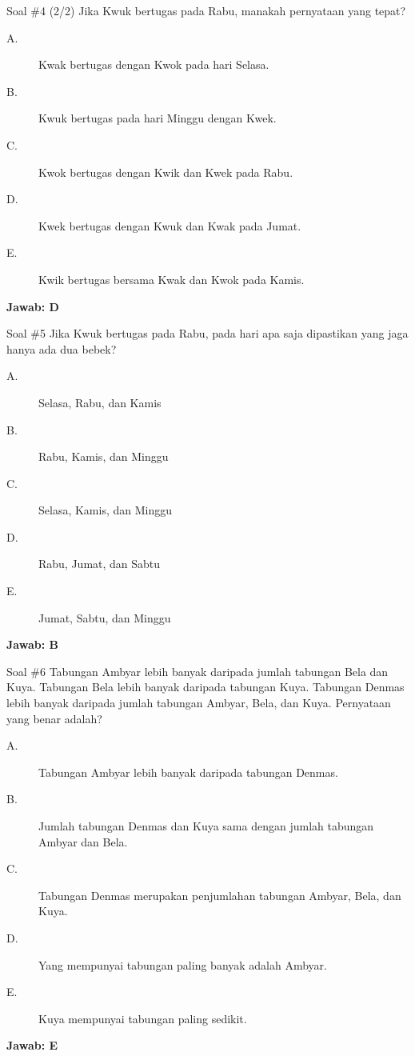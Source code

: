 \documentclass[english,t]{beamer}
\begin{document}
	\begin{frame}{Soal \#4 (2/2)}
		Jika Kwuk bertugas pada Rabu, manakah pernyataan yang tepat?	
		\begin{description}
			\item[A.] Kwak bertugas dengan Kwok pada hari Selasa.
			\item[B.] Kwuk bertugas pada hari Minggu dengan Kwek.
			\item[C.] Kwok bertugas dengan Kwik dan Kwek pada Rabu.
			\item[D.] Kwek bertugas dengan Kwuk dan Kwak pada Jumat.
			\item[E.] Kwik bertugas bersama Kwak dan Kwok pada Kamis.
		\end{description}		
	\pause \textbf{Jawab: D}	
	\end{frame}

	\begin{frame}{Soal \#5}
		Jika Kwuk bertugas pada Rabu, pada hari apa saja dipastikan yang jaga hanya ada dua bebek?
		\begin{description}
			\item[A.] Selasa, Rabu, dan Kamis
			\item[B.] Rabu, Kamis, dan Minggu
			\item[C.] Selasa, Kamis, dan Minggu
			\item[D.] Rabu, Jumat, dan Sabtu
			\item[E.] Jumat, Sabtu, dan Minggu
		\end{description}		
		\pause \textbf{Jawab: B}	
	\end{frame}

	\begin{frame}{Soal \#6}
		Tabungan Ambyar lebih banyak daripada jumlah tabungan Bela dan Kuya. Tabungan Bela lebih banyak daripada tabungan Kuya. Tabungan Denmas lebih banyak daripada jumlah tabungan Ambyar, Bela, dan Kuya. Pernyataan yang benar adalah?
		\begin{description}
			\item[A.] Tabungan Ambyar lebih banyak daripada tabungan Denmas.
			\item[B.] Jumlah tabungan Denmas dan Kuya sama dengan jumlah tabungan Ambyar dan Bela.
			\item[C.] Tabungan Denmas merupakan penjumlahan tabungan Ambyar, Bela, dan Kuya.
			\item[D.] Yang mempunyai tabungan paling banyak adalah Ambyar.
			\item[E.] Kuya mempunyai tabungan paling sedikit.
		\end{description}		
		\pause \textbf{Jawab: E}	
	\end{frame}
\end{document}
